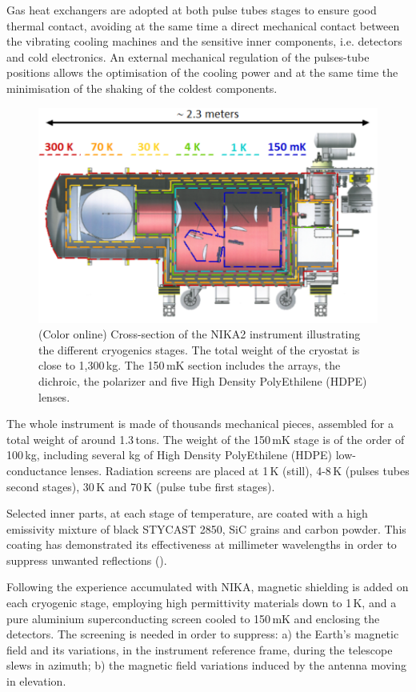 \documentclass[]{aa} %
\begin{document}
Gas heat exchangers are adopted at both pulse tubes stages to ensure good thermal contact, avoiding at the same time a direct mechanical contact between the vibrating cooling machines and the sensitive inner components, i.e. detectors and cold electronics. An external mechanical regulation of the pulses-tube positions allows the optimisation of the cooling power and at the same time the minimisation of the shaking of the coldest components. 

\begin{figure}[h]
   \centering
   \includegraphics[width=.95\linewidth]{NIKA2_cryoStages.png}
      \caption{(Color online) Cross-section of the NIKA2 instrument illustrating the different cryogenics stages. The total weight of the cryostat is close to 1,300\,kg. The 150\,mK section includes the arrays, the dichroic, the polarizer and five High Density PolyEthilene (HDPE) lenses.}
         \label{Cryostat_cryo}
\end{figure}

The whole instrument is made of thousands mechanical pieces, assembled for a total weight of around 1.3\,tons. The weight of the 150\,mK stage is of the order of 100\,kg, including several kg of High Density PolyEthilene (HDPE) low-conductance lenses. Radiation screens are placed at 1\,K (still), 4-8\,K (pulses tubes second stages), 30\,K and 70\,K (pulse tube first stages).

Selected inner parts, at each stage of temperature, are coated with a high emissivity mixture of black STYCAST 2850, SiC grains and carbon powder. This coating has demonstrated its effectiveness at millimeter wavelengths in order to suppress unwanted reflections (\cite{Calvo2010}).

Following the experience accumulated with NIKA, magnetic shielding is added on each cryogenic stage, employing high permittivity materials down to 1\,K, and a pure aluminium superconducting screen cooled to 150\,mK and enclosing the detectors. The screening is needed in order to suppress: a) the Earth's magnetic field and its variations, in the instrument reference frame, during the telescope slews in azimuth; b) the magnetic field variations induced by the antenna moving in elevation. 
\end{document}
